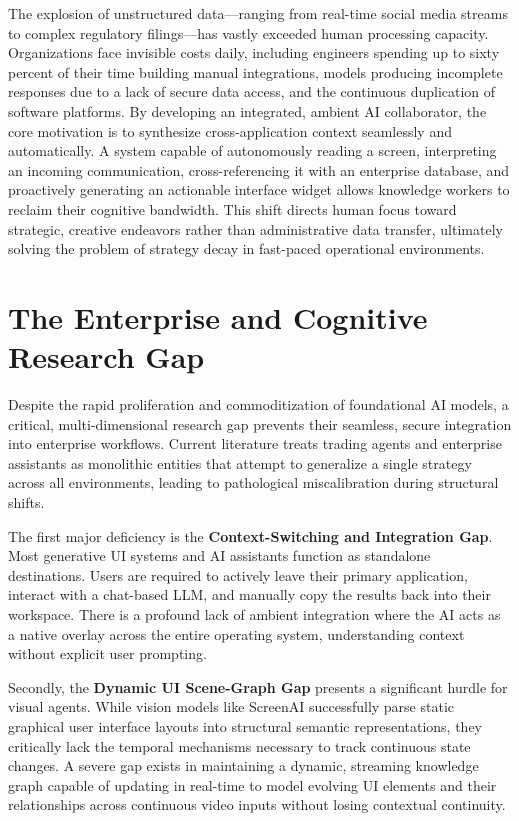 \documentclass[12pt, a4paper]{report}
\begin{document}
The explosion of unstructured data—ranging from real-time social media streams to complex regulatory filings—has vastly exceeded human processing capacity. Organizations face invisible costs daily, including engineers spending up to sixty percent of their time building manual integrations, models producing incomplete responses due to a lack of secure data access, and the continuous duplication of software platforms.\cite{rootstack2026} By developing an integrated, ambient AI collaborator, the core motivation is to synthesize cross-application context seamlessly and automatically. A system capable of autonomously reading a screen, interpreting an incoming communication, cross-referencing it with an enterprise database, and proactively generating an actionable interface widget allows knowledge workers to reclaim their cognitive bandwidth.\cite{hojo2025} This shift directs human focus toward strategic, creative endeavors rather than administrative data transfer, ultimately solving the problem of strategy decay in fast-paced operational environments.

\section{The Enterprise and Cognitive Research Gap}
Despite the rapid proliferation and commoditization of foundational AI models, a critical, multi-dimensional research gap prevents their seamless, secure integration into enterprise workflows. Current literature treats trading agents and enterprise assistants as monolithic entities that attempt to generalize a single strategy across all environments, leading to pathological miscalibration during structural shifts.

The first major deficiency is the \textbf{Context-Switching and Integration Gap}. Most generative UI systems and AI assistants function as standalone destinations.\cite{hojo2025} Users are required to actively leave their primary application, interact with a chat-based LLM, and manually copy the results back into their workspace.\cite{hojo2025} There is a profound lack of ambient integration where the AI acts as a native overlay across the entire operating system, understanding context without explicit user prompting.

Secondly, the \textbf{Dynamic UI Scene-Graph Gap} presents a significant hurdle for visual agents. While vision models like ScreenAI successfully parse static graphical user interface layouts into structural semantic representations, they critically lack the temporal mechanisms necessary to track continuous state changes.\cite{hojo2025} A severe gap exists in maintaining a dynamic, streaming knowledge graph capable of updating in real-time to model evolving UI elements and their relationships across continuous video inputs without losing contextual continuity.\cite{hojo2025}
\end{document}
